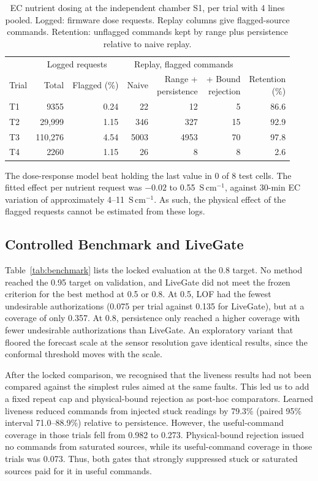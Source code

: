 \documentclass[preprint,12pt,doubleblind]{elsarticle}
\begin{document}
\begin{table}[!htbp]
\centering
\caption{EC nutrient dosing at the independent chamber S1, per trial with 4 lines pooled. Logged: firmware dose requests. Replay columns give flagged-source commands. Retention: unflagged commands kept by range plus persistence relative to naive replay.}
\label{tab:multisite}
\small
\setlength{\tabcolsep}{3.5pt}
\begin{tabular}{lrrrrrr}
\toprule
 & \multicolumn{2}{c}{Logged requests} & \multicolumn{3}{c}{Replay, flagged commands} & \\
Trial & Total & Flagged (\%) & Naive & \shortstack{Range +\\persistence} & \shortstack{+ Bound\\rejection} & \shortstack{Retention\\(\%)} \\
\midrule
T1 & 9355 & 0.24 & 22 & 12 & 5 & 86.6 \\
T2 & 29,999 & 1.15 & 346 & 327 & 15 & 92.9 \\
T3 & 110,276 & 4.54 & 5003 & 4953 & 70 & 97.8 \\
T4 & 2260 & 1.15 & 26 & 8 & 8 & 2.6 \\
\bottomrule
\end{tabular}
\end{table}

The dose-response model beat holding the last value in 0 of 8 test cells. The fitted effect per nutrient request was $-0.02$ to 0.55~\textmu S\,cm$^{-1}$, against 30-min EC variation of approximately 4--11~\textmu S\,cm$^{-1}$. As such, the physical effect of the flagged requests cannot be estimated from these logs.

\subsection{Controlled Benchmark and LiveGate}
Table~\ref{tab:benchmark} lists the locked evaluation at the 0.8 target. No method reached the 0.95 target on validation, and LiveGate did not meet the frozen criterion for the best method at 0.5 or 0.8. At 0.5, LOF had the fewest undesirable authorizations (0.075 per trial against 0.135 for LiveGate), but at a coverage of only 0.357. At 0.8, persistence only reached a higher coverage with fewer undesirable authorizations than LiveGate. An exploratory variant that floored the forecast scale at the sensor resolution gave identical results, since the conformal threshold moves with the scale.

After the locked comparison, we recognised that the liveness results had not been compared against the simplest rules aimed at the same faults. This led us to add a fixed repeat cap and physical-bound rejection as post-hoc comparators. Learned liveness reduced commands from injected stuck readings by 79.3\% (paired 95\% interval 71.0--88.9\%) relative to persistence. However, the useful-command coverage in those trials fell from 0.982 to 0.273. Physical-bound rejection issued no commands from saturated sources, while its useful-command coverage in those trials was 0.073. Thus, both gates that strongly suppressed stuck or saturated sources paid for it in useful commands.
\end{document}
